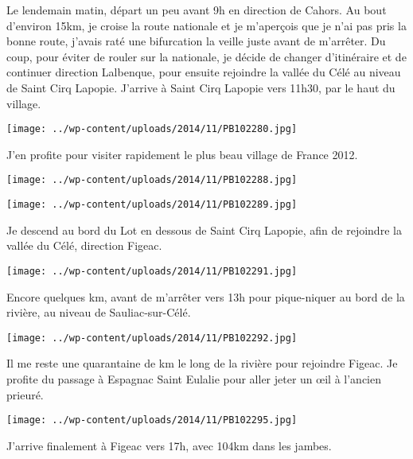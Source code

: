  Le lendemain matin, départ un peu avant 9h en direction de Cahors. Au bout d'environ 15km, je croise la route nationale et je m'aperçois que je n'ai pas pris la bonne route, j'avais raté une bifurcation la veille juste avant de m'arrêter. \newline
 Du coup, pour éviter de rouler sur la nationale, je décide de changer d'itinéraire et de continuer direction Lalbenque, pour ensuite rejoindre la vallée du Célé au niveau de Saint Cirq Lapopie. \newline
 J'arrive à Saint Cirq Lapopie vers 11h30, par le haut du village. \newline
 \newline
\centerline{\texttt{[image: ../wp-content/uploads/2014/11/PB102280.jpg]} } 
 \newline
 J'en profite pour visiter rapidement le plus beau village de France 2012. \newline
 \newline
\centerline{\texttt{[image: ../wp-content/uploads/2014/11/PB102288.jpg]} } 
 \newline
 \newline
\centerline{\texttt{[image: ../wp-content/uploads/2014/11/PB102289.jpg]} } 
 \newline
 Je descend au bord du Lot en dessous de Saint Cirq Lapopie, afin de rejoindre la vallée du Célé, direction Figeac. \newline
 \newline
\centerline{\texttt{[image: ../wp-content/uploads/2014/11/PB102291.jpg]} } 
 \newline
 Encore quelques km, avant de m'arrêter vers 13h pour pique-niquer au bord de la rivière, au niveau de Sauliac-sur-Célé. \newline
 \newline
\centerline{\texttt{[image: ../wp-content/uploads/2014/11/PB102292.jpg]} } 
 \newline
 Il me reste une quarantaine de km le long de la rivière pour rejoindre Figeac. \newline
 Je profite du passage à Espagnac Saint Eulalie pour aller jeter un œil à l'ancien prieuré. \newline
 \newline
\centerline{\texttt{[image: ../wp-content/uploads/2014/11/PB102295.jpg]} } 
 \newline
 J'arrive finalement à Figeac vers 17h, avec 104km dans les jambes. \newline
